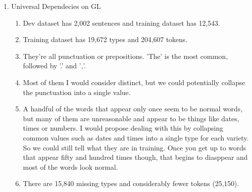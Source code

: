 \documentclass[12pt]{article}
\begin{document}
\begin{enumerate}
\item Universal Dependecies on GL
  \begin{enumerate}
    \item Dev dataset has 2,002 sentences and training dataset has 12,543.
    \item Training dataset has 19,672 types and 204,607 tokens.
    \item They're all punctuation or prepositions. 'The' is the most common, followed 
          by '.' and ','.
    \item Most of them I would consider distinct, but we could potentially collapse 
          the punctuation into a single value.
    \item A handful of the words that appear only once seem to be normal words, but many
          of them are unreasonable and appear to be things like dates, times or numbers.
          I would propose dealing with this by collapsing common values such as dates and
          times into a single type for each variety. So we could still tell what they 
          are in training. Once you get up to words that appear fifty and hundred times
          though, that begins to diasppear and most of the words look normal.
    \item There are 15,840 missing types and considerably fewer tokens (25,150).
  \end{enumerate}

\end{enumerate}
\end{document}
